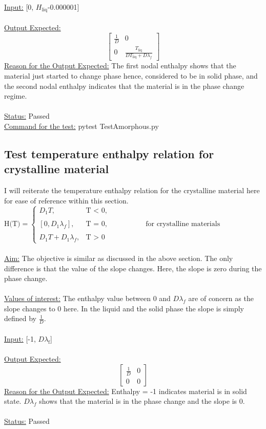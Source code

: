\noindent \underline{Input:} [0, $H_{\text{liq}}$-0.000001]\\ \\

\noindent \underline{Output Expected:}
\[
\begin{bmatrix}
\frac{1}{D} & 0 \\
0 & \frac{T_{\text{liq}}}{D T_{\text{liq}} + D \lambda_{f}}
\end{bmatrix}
\]
\underline{Reason for the Output Expected:} The first nodal enthalpy shows that the material just started to change phase hence, considered to be in solid phase, and the second nodal enthalpy indicates that the material is in the phase change regime.\\ \\
\underline{Status:} Passed\\

\noindent \underline{Command for the test:} pytest Test\textunderscore Amorphous.py\\

\subsection{Test temperature enthalpy relation for crystalline material}
I will reiterate the temperature enthalpy relation for the crystalline material here for ease of reference within this section.\\
$\text{H(T)} =
\begin{cases}
D_1 T, & \text{T < 0}, \\ \\
[0, D_1 \lambda_f], & \text{T = 0}, \\ \\
D_1 T + D_1\lambda_f, & \text{T > 0}
\end{cases}\quad\quad\quad\quad\quad\text{for crystalline materials}$ \\ \\
\underline{Aim:} The objective is similar as discussed in the above section. The only difference is that the value of the slope changes. Here, the slope is zero during the phase change.\\ \\
\underline{Values of interest:} The enthalpy value between 0 and $D \lambda_f$ are of concern as the slope changes to 0 here. In the liquid and the solid phase the slope is simply defined by $\frac{1}{D}$. \\ \\
\underline{Input:} [-1, $D \lambda_\text{f}$]\\ \\
\noindent\underline{Output Expected:}
\[
\begin{bmatrix}
\frac{1}{D} & 0 \\
0 & 0
\end{bmatrix}
\]
\underline{Reason for the Output Expected:} Enthalpy = -1 indicates material is in solid state. $D \lambda_f$ shows that the material is in the phase change and the slope is 0.\\ \\
\underline{Status:} Passed\\

